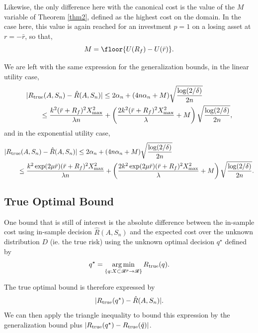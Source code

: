 \begin{rem}
  Likewise, the only difference here with the canonical cost is the value of the $M$
  variable of Theorem \ref{thm2}, defined as the highest cost on the domain. In the case
  here, this value is again reached for an investment $p=1$ on a losing asset at $r=-\bar
  r$, so that,
  \begin{equation}
    M = \floor{U(R_f) - U(\bar r)}.
  \end{equation}

  We are left with the same expression for the generalization bounds, in the linear
  utility case,
  \begin{align}
    &|R_{\mathrm{true}}(A,S_n) - \hat{R}(A,S_n)| \leq 2\alpha_n + (4n\alpha_n +
      M)\sqrt{\frac{\log(2/\delta)}{2n}}\\
    &\qquad \leq \frac{k^2(\bar r+R_f)^2X^2_{\max}}{\lambda n} + \left(\frac{2k^2(\bar r+R_f)^2X^2_{\max}}{\lambda} + M\right)\sqrt{\frac{\log(2/\delta)}{2n}},
  \end{align}
  and in the exponential utility case, 
  \begin{align}
    &|R_{\mathrm{true}}(A,S_n) - \hat{R}(A,S_n)| \leq 2\alpha_n + (4n\alpha_n +
      M)\sqrt{\frac{\log(2/\delta)}{2n}}\\
    &\qquad \leq \frac{k^2 \exp(2\mu\bar r)(\bar r + R_f)^2 X^2_{\max}}{\lambda n} + \left(\frac{2k^2 \exp(2\mu\bar r)(\bar r + R_f)^2 X^2_{\max}}{\lambda} + M\right)\sqrt{\frac{\log(2/\delta)}{2n}}.
  \end{align}
\end{rem}

\subsection{True Optimal Bound}

One bound that is still of interest is the absolute difference between the in-sample cost
using in-sample decision $\hat R(A,S_n)$ and the expected cost over the unknown
distribution $D$ (ie. the true risk) using the unknown optimal decision $q^\star$ defined
by
\begin{equation}
  q^\star = \operatorname*{arg\,min}_{\{q:X\subset\mathscr{R}^p\to\mathscr{R}\}}R_{\mathrm{true}}(q).
\end{equation}

The true optimal bound is therefore expressed by
\begin{equation}
|R_{\mathrm{true}}(q^\star) - \hat R(A,S_n)|.  
\end{equation}
We can then apply the triangle inequality to bound this expression by the generalization
bound plus $|R_{\mathrm{true}}(q^\star) - R_{\mathrm{true}}(\hat q)|$. 

